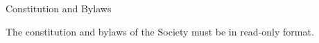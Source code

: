 \begin{longenum}[label*=\thesection.\arabic*., align=left]
\begin{longenum}[label*=\arabic*., align=left]
\begin{longenum}[label*=\arabic*., align=left]
\end{longenum}
\item Constitution and Bylaws
\begin{longenum}[label*=\arabic*., align=left]
\item The constitution and bylaws of the Society must be in read-only format.
\end{longenum}
\end{longenum}
\end{longenum}
